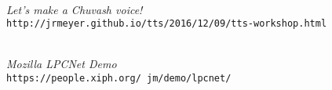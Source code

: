 \documentclass[fleqn,10pt]{SelfArx} %
\begin{document}
\begin{thebibliography}{9}
\\
\textit{Let's make a Chuvash voice!}\\
\texttt{http://jrmeyer.github.io/tts/2016/12/09/tts-workshop.html}

\\
\textit{Mozilla LPCNet Demo}\\
\texttt{https://people.xiph.org/~jm/demo/lpcnet/}
\end{thebibliography}


\end{document}
